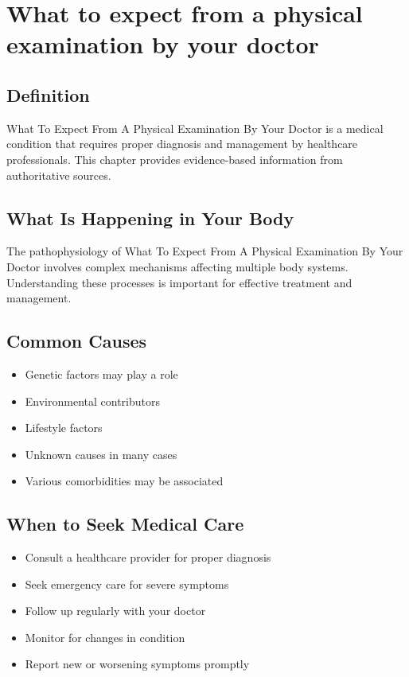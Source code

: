 
\chapter{What to expect from a physical examination by your doctor}

\section*{Definition}
What To Expect From A Physical Examination By Your Doctor is a medical condition that requires proper diagnosis and management by healthcare professionals. This chapter provides evidence-based information from authoritative sources.

\section*{What Is Happening in Your Body}
The pathophysiology of What To Expect From A Physical Examination By Your Doctor involves complex mechanisms affecting multiple body systems. Understanding these processes is important for effective treatment and management.

\section*{Common Causes}
\begin{itemize}
  \item Genetic factors may play a role
  \item Environmental contributors
  \item Lifestyle factors
  \item Unknown causes in many cases
  \item Various comorbidities may be associated
\end{itemize}

\section*{When to Seek Medical Care}
\begin{itemize}
  \item Consult a healthcare provider for proper diagnosis
  \item Seek emergency care for severe symptoms
  \item Follow up regularly with your doctor
  \item Monitor for changes in condition
  \item Report new or worsening symptoms promptly
\end{itemize}

